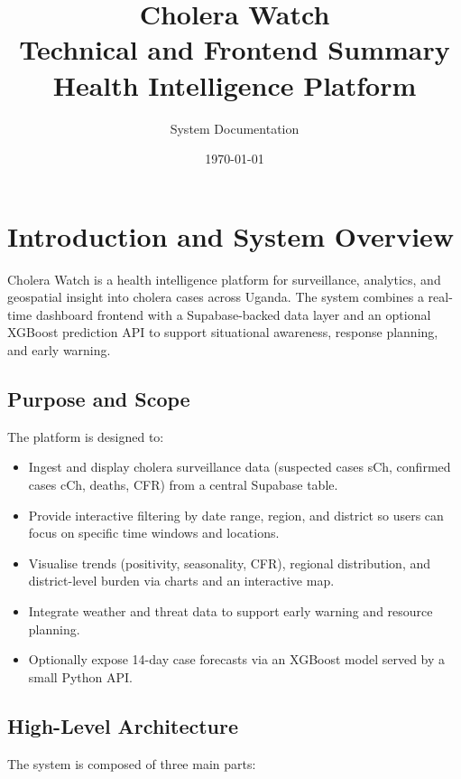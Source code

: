 \documentclass[11pt,a4paper]{article}
\title{\textbf{Cholera Watch}\\Technical and Frontend Summary\\\large Health Intelligence Platform}}
\author{System Documentation}
\date{\today}
\begin{document}
\maketitle
\tableofcontents
\newpage

\section{Introduction and System Overview}

Cholera Watch is a health intelligence platform for surveillance, analytics, and geospatial insight into cholera cases across Uganda. The system combines a real-time dashboard frontend with a Supabase-backed data layer and an optional XGBoost prediction API to support situational awareness, response planning, and early warning.

\subsection{Purpose and Scope}

The platform is designed to:
\begin{itemize}[noitemsep]
    \item Ingest and display cholera surveillance data (suspected cases sCh, confirmed cases cCh, deaths, CFR) from a central Supabase table.
    \item Provide interactive filtering by date range, region, and district so users can focus on specific time windows and locations.
    \item Visualise trends (positivity, seasonality, CFR), regional distribution, and district-level burden via charts and an interactive map.
    \item Integrate weather and threat data to support early warning and resource planning.
    \item Optionally expose 14-day case forecasts via an XGBoost model served by a small Python API.
\end{itemize}

\subsection{High-Level Architecture}

The system is composed of three main parts:
\end{document}
